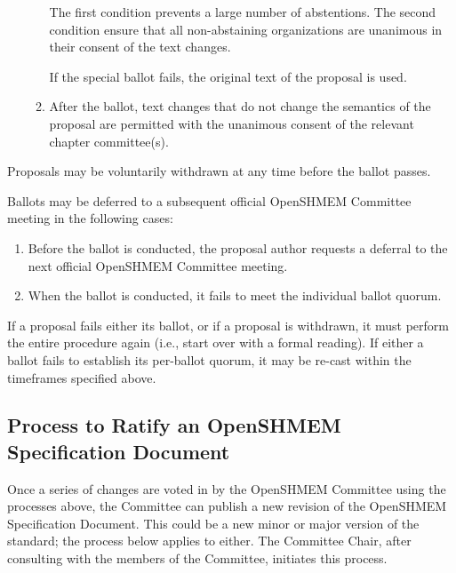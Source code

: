\begin{enumerate}
\begin{enumerate}
    \begin{rationale}
      The first condition prevents a large number of abstentions.
      The second condition ensure that all non-abstaining
      organizations are unanimous in their consent of the text
      changes.
    \end{rationale}

    If the special ballot fails, the original text of the proposal
    is used.

  \item After the ballot, text changes that do not change the
    semantics of the proposal are permitted with the unanimous consent
    of the relevant chapter committee(s).
  \end{enumerate}
\end{enumerate}

Proposals may be voluntarily withdrawn at any time before the
ballot passes.

Ballots may be deferred to a subsequent official OpenSHMEM Committee meeting in
the following cases:

\begin{enumerate}
\item Before the ballot is conducted, the proposal author requests a
  deferral to the next official OpenSHMEM Committee meeting.
\item When the ballot is conducted, it fails to meet the individual
  ballot quorum.
\end{enumerate}

If a proposal fails either its ballot, or if a proposal is
withdrawn, it must perform the entire procedure again (i.e., start
over with a formal reading).  If either a ballot fails to establish its
per-ballot quorum, it may be re-cast within the timeframes specified
above.


\subsection{Process to Ratify an OpenSHMEM Specification Document}

Once a series of changes are voted in by
the OpenSHMEM Committee using the processes above, the Committee can publish a new
revision of the OpenSHMEM Specification Document.  This could be a new minor or
major version of the standard; the process below applies to either.
The Committee Chair, after consulting with the members of the Committee,
initiates this process.

